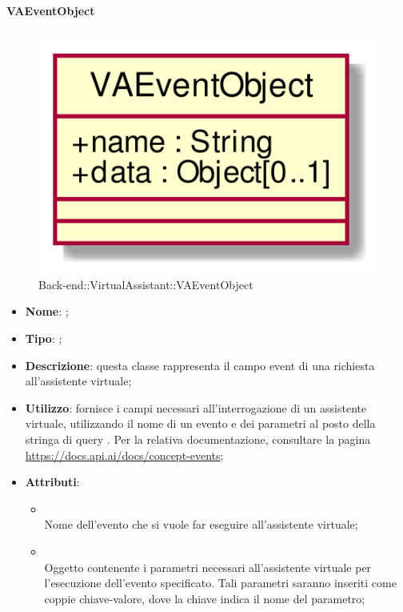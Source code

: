\hypertarget{VAEventObject_label}{\paragraph{VAEventObject}}
\begin{figure}[h]
	\centering
	\includegraphics[width=\textwidth,height=\textheight,keepaspectratio]{images/ClassVAEventObject.png}
	\caption{Back-end::VirtualAssistant::VAEventObject}
\end{figure}
\begin{itemize}
	\item \textbf{Nome}: ;
	\item \textbf{Tipo}: ;
	\item \textbf{Descrizione}: questa classe rappresenta il campo event di una richiesta all'assistente virtuale;
	\item \textbf{Utilizzo}: fornisce i campi necessari all'interrogazione di un assistente virtuale, utilizzando il nome di un evento e dei parametri al posto della stringa di query .
Per la relativa documentazione, consultare la pagina \url{https://docs.api.ai/docs/concept-events};
	\item \textbf{Attributi}:
	\begin{itemize}
		\item[]  \\
		Nome dell'evento che si vuole far eseguire all'assistente virtuale;
		\item[]  \\
		Oggetto contenente i parametri necessari all'assistente virtuale per l'esecuzione dell'evento specificato. Tali parametri saranno inseriti come coppie chiave-valore, dove la chiave indica il nome del parametro;
	\end{itemize}
\end{itemize}

